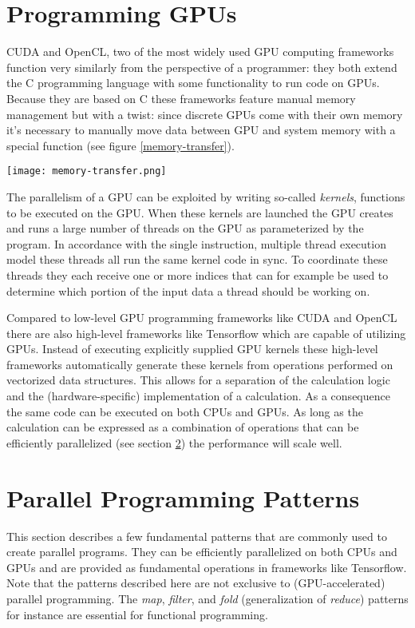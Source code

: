 \section{Programming GPUs}
\label{sec:programming}
CUDA\cite{cuda} and OpenCL\cite{opencl}, two of the most widely used GPU computing frameworks function very similarly from the perspective of a programmer:
they both extend the C programming language\cite{c} with some functionality to run code on GPUs.
Because they are based on C these frameworks feature manual memory management but with a twist:
since discrete GPUs come with their own memory it's necessary to manually move data between
GPU and system memory with a special function (see figure \ref{memory-transfer}).
\begin{figure*}
	\texttt{[image: memory-transfer.png]}
	\caption{
		Graphical representation of the transfer of data between memory accessible by the CPU (system memory)
		and the GPU (frame buffer).
		The data is transferred with a special function
		(CUDA's cudaMemcpy in this case, other frameworks have equivalent functions).
	}
	\label{memory-transfer}
\end{figure*}

The parallelism of a GPU can be exploited by writing so-called \textit{kernels}, functions to be executed on the GPU.
When these kernels are launched the GPU creates and runs a large number of threads on the GPU as parameterized by the program.
In accordance with the single instruction, multiple thread execution model these threads all run the same kernel code in sync.
To coordinate these threads they each receive one or more indices that can for example
be used to determine which portion of the input data a thread should be working on.

Compared to low-level GPU programming frameworks like CUDA and OpenCL there are also high-level frameworks like
Tensorflow\cite{tensorflow} which are capable of utilizing GPUs.
Instead of executing explicitly supplied GPU kernels these high-level frameworks automatically generate these kernels from
operations performed on vectorized data structures.
This allows for a separation of the calculation logic and the (hardware-specific) implementation of a calculation.
As a consequence the same code can be executed on both CPUs and GPUs.
As long as the calculation can be expressed as a combination of operations that can be efficiently parallelized
(see section \ref{sec:ppp}) the performance will scale well.
\section{Parallel Programming Patterns}
\label{sec:ppp}
This section describes a few fundamental patterns that are commonly used to create parallel programs.
They can be efficiently parallelized on both CPUs and GPUs and are provided as fundamental operations in frameworks like Tensorflow.
Note that the patterns described here are not exclusive to (GPU-accelerated) parallel programming.
The \textit{map}, \textit{filter}, and \textit{fold} (generalization of \textit{reduce}) patterns for instance are essential for functional programming.

